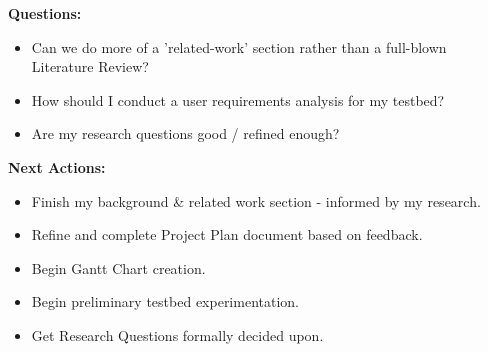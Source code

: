 \documentclass[5pt]{article}
\begin{document}
\vspace{2em} 

\noindent \textbf{\large Questions:}
\begin{itemize}[label=$\bullet$]
    \item Can we do more of a 'related-work' section rather than a full-blown Literature Review?
    \item How should I conduct a user requirements analysis for my testbed?
    \item Are my research questions good / refined enough?
\end{itemize}

\vspace{2em} 

\noindent \textbf{\large Next Actions:}
\begin{itemize}[label=$\bullet$]
    \item Finish my background \& related work section - informed by my research.
    \item Refine and complete Project Plan document based on feedback.
    \item Begin Gantt Chart creation.
    \item Begin preliminary testbed experimentation.
    \item Get Research Questions formally decided upon.
\end{itemize}

\vspace{3em} 
\end{document}
